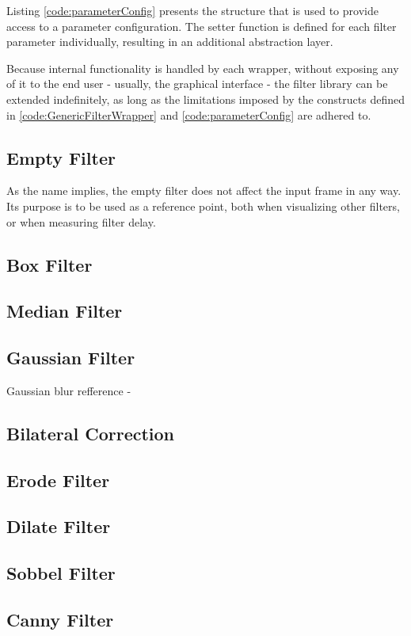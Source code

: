 Listing \ref{code:parameterConfig} presents the structure that is used to provide access to a parameter
configuration. The setter function is defined for each filter parameter individually, resulting in an
additional abstraction layer.

Because internal functionality is handled by each wrapper, without exposing any of it to the end
user - usually, the graphical interface - the filter library can be extended indefinitely, as long as
the limitations imposed by the constructs defined in \ref{code:GenericFilterWrapper} and 
\ref{code:parameterConfig} are adhered to.

\subsection{Empty Filter}

As the name implies, the empty filter does not affect the input frame in any way. Its purpose is to be
used as a reference point, both when visualizing other filters, or when measuring filter delay.

\subsection{Box Filter}
\subsection{Median Filter}
\subsection{Gaussian Filter}

Gaussian blur refference - \cite{gaussian}

\subsection{Bilateral Correction}
\subsection{Erode Filter}
\subsection{Dilate Filter}
\subsection{Sobbel Filter}
\subsection{Canny Filter}
